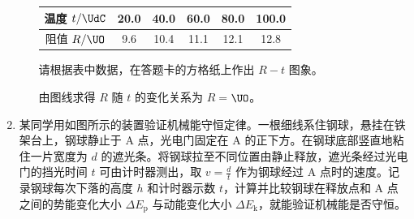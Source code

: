 \documentclass[\gkver]{gaokaozhenti}
\begin{document}
\begin{enumerate}
\begin{enumerate}
	\begin{center}
	\begin{tabular}{|c|c|c|c|c|c|}
	\hline
	温度 $t/\UdC$ & 20.0 & 40.0 & 60.0 & 80.0 & 100.0 \\
	\hline
	阻值 $R/\UO$ & 9.6 & 10.4 & 11.1 & 12.1 & 12.8 \\
	\hline
	\end{tabular}
	\end{center}

	请根据表中数据，在答题卡的方格纸上作出 $R-t$ 图象。

	\onepicture[w=6.95cm]{}

	由图线求得 $R$ 随 $t$ 的变化关系为 $R=$$\UO$。
\end{enumerate}

\item
某同学用如图所示的装置验证机械能守恒定律。一根细线系住钢球，悬挂在铁架台上，钢球静止于 A 点，光电门固定在 A 的正下方。在钢球底部竖直地粘住一片宽度为 $d$ 的遮光条。将钢球拉至不同位置由静止释放，遮光条经过光电门的挡光时间 $t$ 可由计时器测出，取 $v=\frac{d}{t}$ 作为钢球经过 A 点时的速度。记录钢球每次下落的高度 $h$ 和计时器示数 $t$，计算并比较钢球在释放点和 A 点之间的势能变化大小 $\Delta E_{\mathrm{p}}$ 与动能变化大小 $\Delta E_{\mathrm{k}}$，就能验证机械能是否守恒。



\end{enumerate}
\end{document}
